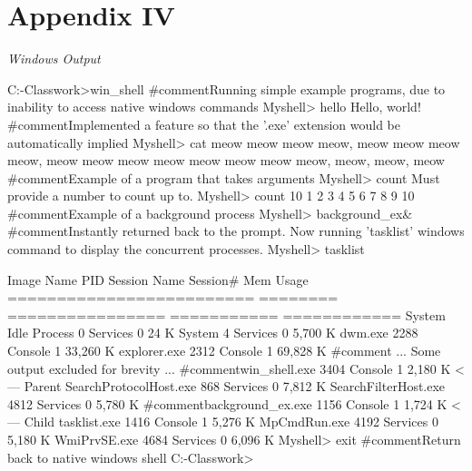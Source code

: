\documentclass[12pt]{article}
\newcommand {\append}[2] {\section*{Appendix #1} \textsl{\large #2}}
\begin{document}
\append{IV} {Windows Output}
\begin{shelloutput}
C:\Users\Enrique\School\OS-Classwork>win_shell
#comment{Running simple example programs, due to inability to access native windows commands}
Myshell> hello
Hello, world!
#comment{Implemented a feature so that the '.exe' extension  would be automatically implied}
Myshell> cat
meow meow meow meow, meow meow meow meow, meow meow meow meow meow meow meow 
meow, meow, meow, meow
#comment{Example of a program that takes arguments}
Myshell> count
Must provide a number to count up to.
Myshell> count 10
1
2
3
4
5
6
7
8
9
10
#comment{Example of a background process}
Myshell> background_ex&
#comment{Instantly returned back to the prompt. Now running 'tasklist' windows command to display the concurrent processes.}
Myshell> tasklist

Image Name                     PID Session Name        Session#    Mem Usage
========================= ======== ================ =========== ============
System Idle Process              0 Services                   0         24 K
System                           4 Services                   0      5,700 K
dwm.exe                       2288 Console                    1     33,260 K
explorer.exe                  2312 Console                    1     69,828 K
#comment{ ... Some output excluded for brevity ...}
#comment{win_shell.exe                 3404 Console                    1      2,180 K   <--- Parent}
SearchProtocolHost.exe         868 Services                   0      7,812 K
SearchFilterHost.exe          4812 Services                   0      5,780 K
#comment{background_ex.exe             1156 Console                    1      1,724 K   <--- Child}
tasklist.exe                  1416 Console                    1      5,276 K
MpCmdRun.exe                  4192 Services                   0      5,180 K
WmiPrvSE.exe                  4684 Services                   0      6,096 K
Myshell> exit
#comment{Return back to native windows shell}
C:\Users\Enrique\School\OS-Classwork>
\end{shelloutput}
\end{document}
